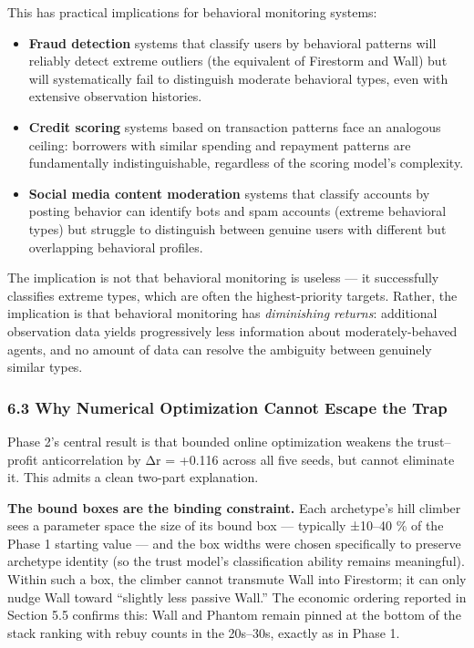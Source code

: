 \documentclass[
]{article}
\providecommand{\tightlist}{%
  \setlength{\itemsep}{0pt}\setlength{\parskip}{0pt}}
\begin{document}
This has practical implications for behavioral monitoring systems:

\begin{itemize}
\tightlist
\item
  \textbf{Fraud detection} systems that classify users by behavioral
  patterns will reliably detect extreme outliers (the equivalent of
  Firestorm and Wall) but will systematically fail to distinguish
  moderate behavioral types, even with extensive observation histories.
\item
  \textbf{Credit scoring} systems based on transaction patterns face an
  analogous ceiling: borrowers with similar spending and repayment
  patterns are fundamentally indistinguishable, regardless of the
  scoring model's complexity.
\item
  \textbf{Social media content moderation} systems that classify
  accounts by posting behavior can identify bots and spam accounts
  (extreme behavioral types) but struggle to distinguish between genuine
  users with different but overlapping behavioral profiles.
\end{itemize}

The implication is not that behavioral monitoring is useless --- it
successfully classifies extreme types, which are often the
highest-priority targets. Rather, the implication is that behavioral
monitoring has \emph{diminishing returns}: additional observation data
yields progressively less information about moderately-behaved agents,
and no amount of data can resolve the ambiguity between genuinely
similar types.

\hypertarget{why-numerical-optimization-cannot-escape-the-trap}{%
\subsubsection{6.3 Why Numerical Optimization Cannot Escape the
Trap}\label{why-numerical-optimization-cannot-escape-the-trap}}

Phase 2's central result is that bounded online optimization weakens the
trust--profit anticorrelation by Δr = +0.116 across all five seeds, but
cannot eliminate it. This admits a clean two-part explanation.

\textbf{The bound boxes are the binding constraint.} Each archetype's
hill climber sees a parameter space the size of its bound box ---
typically ±10--40 \% of the Phase 1 starting value --- and the box
widths were chosen specifically to preserve archetype identity (so the
trust model's classification ability remains meaningful). Within such a
box, the climber cannot transmute Wall into Firestorm; it can only nudge
Wall toward ``slightly less passive Wall.'' The economic ordering
reported in Section 5.5 confirms this: Wall and Phantom remain pinned at
the bottom of the stack ranking with rebuy counts in the 20s--30s,
exactly as in Phase 1.
\end{document}
